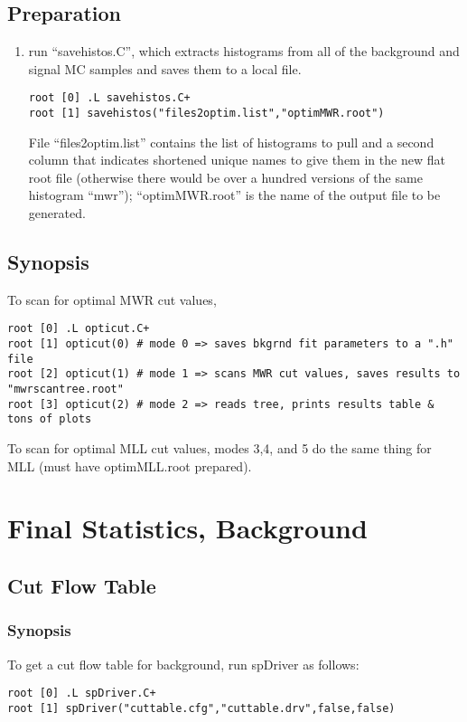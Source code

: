 \documentclass[english]{article}
\begin{document}
\subsection{Preparation}
%
\begin{enumerate}
\item run ``savehistos.C'', which extracts histograms from all of the
background and signal MC samples and saves them to a local file.
%
\begin{lstlisting}
root [0] .L savehistos.C+
root [1] savehistos("files2optim.list","optimMWR.root")
\end{lstlisting}
%
File ``files2optim.list'' contains the list of histograms to pull
and a second column that indicates shortened unique names to give them
in the new flat root file (otherwise there would be over a hundred
versions of the same histogram ``mwr''); ``optimMWR.root'' is the
name of the output file to be generated.
%
\end{enumerate}

\subsection{Synopsis}
%
To scan for optimal MWR cut values,
\begin{lstlisting}
root [0] .L opticut.C+
root [1] opticut(0) # mode 0 => saves bkgrnd fit parameters to a ".h" file
root [2] opticut(1) # mode 1 => scans MWR cut values, saves results to "mwrscantree.root"
root [3] opticut(2) # mode 2 => reads tree, prints results table & tons of plots
\end{lstlisting}
%
To scan for optimal MLL cut values, modes 3,4, and 5 do the same thing
for MLL (must have optimMLL.root prepared).

\section{Final Statistics, Background}

\subsection{Cut Flow Table}

\subsubsection{Synopsis}
%
To get a cut flow table for background, run spDriver as follows:
%
\begin{lstlisting}
root [0] .L spDriver.C+
root [1] spDriver("cuttable.cfg","cuttable.drv",false,false)
\end{lstlisting}
\end{document}
